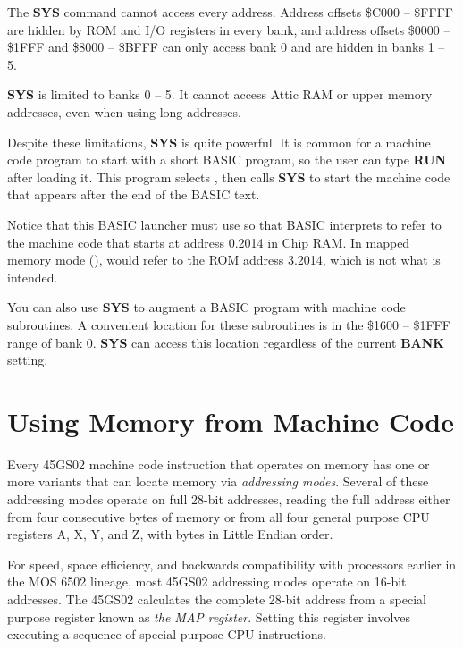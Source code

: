 The {\bf SYS} command cannot access every address. Address offsets \$C000 --
\$FFFF are hidden by ROM and I/O registers in every bank, and address offsets
\$0000 -- \$1FFF and \$8000 -- \$BFFF can only access bank 0 and are hidden in
banks 1 -- 5.

{\bf SYS} is limited to banks 0 -- 5. It cannot access Attic RAM or upper
memory addresses, even when using long addresses.

Despite these limitations, {\bf SYS} is quite powerful. It is common for a
machine code program to start with a short BASIC program, so the user can type
{\bf RUN} after loading it. This program selects , then calls {\bf SYS}
to start the machine code that appears after the end of the BASIC text.


Notice that this BASIC launcher must use  so that BASIC interprets
 to refer to the machine code that starts at address 0.2014 in
Chip RAM. In mapped memory mode (),  would refer to the ROM
address 3.2014, which is not what is intended.

You can also use {\bf SYS} to augment a BASIC program with machine code
subroutines. A convenient location for these subroutines is in the \$1600 --
\$1FFF range of bank 0. {\bf SYS} can access this location regardless of the
current {\bf BANK} setting.


\newpage
\section{Using Memory from Machine Code}

Every 45GS02 machine code instruction that operates on memory has one or more
variants that can locate memory via {\em addressing modes}. Several of these
addressing modes operate on full 28-bit addresses, reading the full address
either from four consecutive bytes of memory or from all four general purpose
CPU registers A, X, Y, and Z, with bytes in Little Endian order.

For speed, space efficiency, and backwards compatibility with processors
earlier in the MOS 6502 lineage, most 45GS02 addressing modes operate on 16-bit
addresses. The 45GS02 calculates the complete 28-bit address from a special
purpose register known as {\em the MAP register}. Setting this register
involves executing a sequence of special-purpose CPU instructions.

